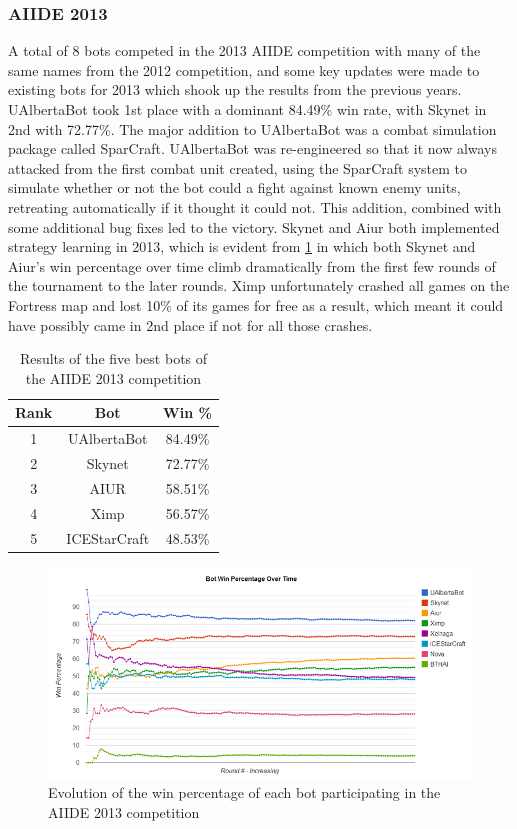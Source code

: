 \documentclass{llncs}
\begin{document}
\subsubsection{AIIDE 2013}

A total of 8 bots competed in the 2013 AIIDE competition with many of the same names from the 2012 competition, and some key updates were made to existing bots for 2013 which shook up the results from the previous years. UAlbertaBot took 1st place with a dominant 84.49\% win rate, with Skynet in 2nd with 72.77\%. The major addition to UAlbertaBot was a combat simulation package called SparCraft. UAlbertaBot was re-engineered so that it now always attacked from the first combat unit created, using the SparCraft system to simulate whether or not the bot could a fight against known enemy units, retreating automatically if it thought it could not. This addition, combined with some additional bug fixes led to the victory. Skynet and Aiur both implemented strategy learning in 2013, which is evident from \ref{fig:aiide2013} in which both Skynet and Aiur's win percentage over time climb dramatically from the first few rounds of the tournament to the later rounds. Ximp unfortunately crashed all games on the Fortress map and lost 10\% of its games for free as a result, which meant it could have possibly came in 2nd place if not for all those crashes. 

\begin{table}[!t]
\caption{Results of the five best bots of the AIIDE 2013 competition}
\label{tab:aiide2013}
\centering
\begin{tabular}{|c|c|c|}
\hline
{\bfseries Rank} & {\bfseries Bot} & {\bfseries Win \%} \\
\hline
1 & UAlbertaBot & 84.49\% \\
2 & Skynet & 72.77\% \\
3 & AIUR & 58.51\% \\
4 & Ximp & 56.57\% \\
5 & ICEStarCraft & 48.53\% \\
\hline
\end{tabular}
\end{table}

\begin{figure}[t!]
    \centering
    \includegraphics[width=\columnwidth]{figures/aiide2013}
    \caption{Evolution of the win percentage of each bot participating in the AIIDE 2013 competition}
    \label{fig:aiide2013}
\end{figure}
\end{document}
